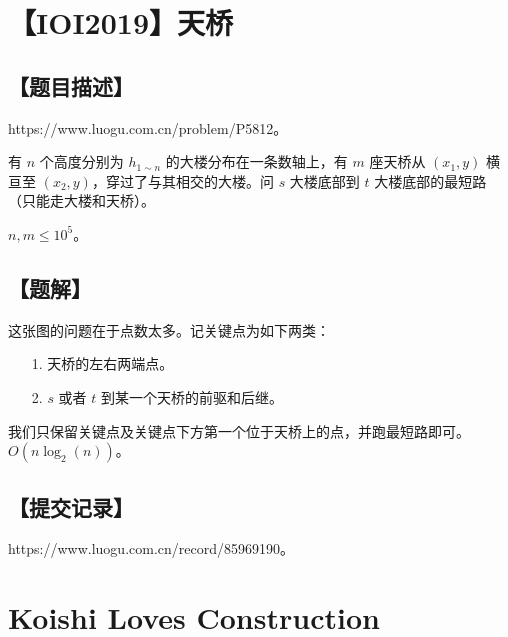 \documentclass[UTF8,12pt,a4paper]{ctexart}
\begin{document}
	
	\section*{【IOI2019】天桥}
	
	\subsection*{【题目描述】}
	
	https://www.luogu.com.cn/problem/P5812。
	
	有 $n$ 个高度分别为 $h_{1\sim n}$ 的大楼分布在一条数轴上，有 $m$ 座天桥从 $(x_1,y)$ 横亘至 $(x_2,y)$，穿过了与其相交的大楼。问 $s$ 大楼底部到 $t$ 大楼底部的最短路（只能走大楼和天桥）。
	
	$n,m\le 10^5$。
	
	\subsection*{【题解】}
	
	这张图的问题在于点数太多。记关键点为如下两类：
	
	\begin{itemize}
		\item[1.] 天桥的左右两端点。
		\item[2.] $s$ 或者 $t$ 到某一个天桥的前驱和后继。
	\end{itemize}

	我们只保留关键点及关键点下方第一个位于天桥上的点，并跑最短路即可。$O(n\log_2(n))$。
	
	
	\subsection*{【提交记录】}
	
	https://www.luogu.com.cn/record/85969190。
	
	
	\section*{Koishi Loves Construction}
	
\end{document}
